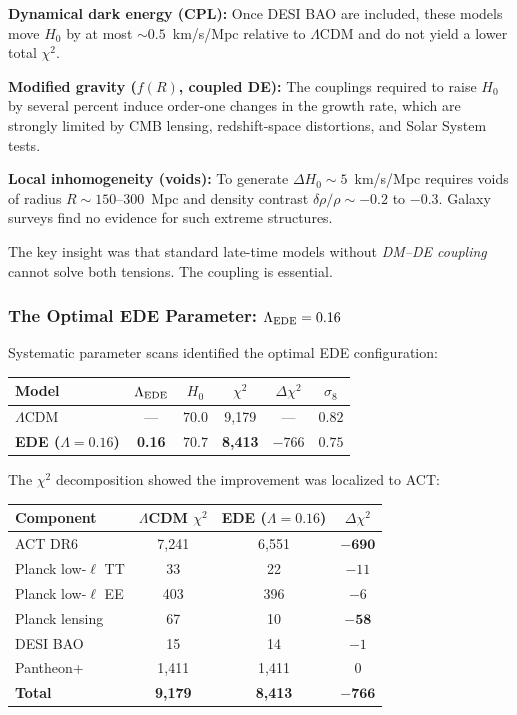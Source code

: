 \documentclass[twocolumn,showpacs,preprintnumbers,amsmath,amssymb,prd]{revtex4-2}
\begin{document}
\textbf{Dynamical dark energy (CPL):} Once DESI BAO are included, these models move $H_0$ by at most $\sim 0.5$~km/s/Mpc relative to $\Lambda$CDM and do not yield a lower total $\chi^2$.

\textbf{Modified gravity ($f(R)$, coupled DE):} The couplings required to raise $H_0$ by several percent induce order-one changes in the growth rate, which are strongly limited by CMB lensing, redshift-space distortions, and Solar System tests.

\textbf{Local inhomogeneity (voids):} To generate $\Delta H_0 \sim 5$~km/s/Mpc requires voids of radius $R \sim 150$--300~Mpc and density contrast $\delta\rho/\rho \sim -0.2$ to $-0.3$. Galaxy surveys find no evidence for such extreme structures.

The key insight was that standard late-time models without \textit{DM--DE coupling} cannot solve both tensions. The coupling is essential.

\subsubsection{The Optimal EDE Parameter: $\Lambda_{\rm EDE} = 0.16$}

Systematic parameter scans identified the optimal EDE configuration:
\begin{center}
\begin{tabular}{lccccc}
\toprule
Model & $\Lambda_{\rm EDE}$ & $H_0$ & $\chi^2$ & $\Delta\chi^2$ & $\sigma_8$ \\
\midrule
$\Lambda$CDM & --- & $70.0$ & 9{,}179 & --- & $0.82$ \\
\textbf{EDE ($\Lambda = 0.16$)} & \textbf{0.16} & $\mathbf{70.7}$ & \textbf{8{,}413} & \textbf{$-766$} & $\mathbf{0.75}$ \\
\bottomrule
\end{tabular}
\end{center}

The $\chi^2$ decomposition showed the improvement was localized to ACT:
\begin{center}
\begin{tabular}{lccc}
\toprule
Component & $\Lambda$CDM $\chi^2$ & EDE ($\Lambda = 0.16$) & $\Delta\chi^2$ \\
\midrule
ACT DR6 & 7{,}241 & 6{,}551 & $\mathbf{-690}$ \\
Planck low-$\ell$ TT & 33 & 22 & $-11$ \\
Planck low-$\ell$ EE & 403 & 396 & $-6$ \\
Planck lensing & 67 & 10 & $\mathbf{-58}$ \\
DESI BAO & 15 & 14 & $-1$ \\
Pantheon+ & 1{,}411 & 1{,}411 & $0$ \\
\midrule
\textbf{Total} & \textbf{9{,}179} & \textbf{8{,}413} & $\mathbf{-766}$ \\
\bottomrule
\end{tabular}
\end{center}
\end{document}
